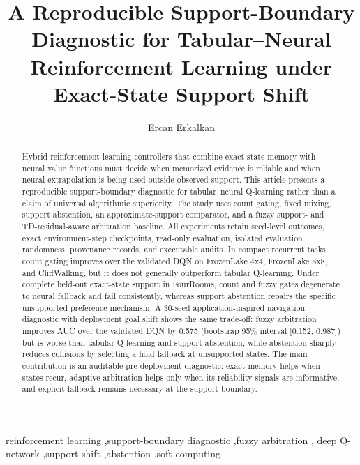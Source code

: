 \documentclass[preprint,12pt]{elsarticle}
\begin{document}
\begin{frontmatter}

\title{A Reproducible Support-Boundary Diagnostic for Tabular--Neural
Reinforcement Learning under Exact-State Support Shift}

\author[inst1]{Ercan Erkalkan}
\address[inst1]{Vocational School of Technical Sciences, Department of
Electronics and Automation, Artificial Intelligence Operator Program,
Marmara University, Mehmet Gen\c{c} Campus, 34865 Kartal, Istanbul, Turkey}

\begin{abstract}
Hybrid reinforcement-learning controllers that combine exact-state memory with
neural value functions must decide when memorized evidence is reliable and when
neural extrapolation is being used outside observed support. This article
presents a reproducible support-boundary diagnostic for tabular--neural
Q-learning rather than a claim of universal algorithmic superiority. The study
uses count gating, fixed mixing, support abstention, an approximate-support
comparator, and a fuzzy support- and TD-residual-aware arbitration baseline. All
experiments retain seed-level outcomes, exact environment-step checkpoints,
read-only evaluation, isolated evaluation randomness, provenance records, and
executable audits. In compact recurrent tasks, count gating improves over the
validated DQN on FrozenLake 4x4, FrozenLake 8x8, and CliffWalking, but it does
not generally outperform tabular Q-learning. Under complete held-out exact-state
support in FourRooms, count and fuzzy gates degenerate to neural fallback and
fail consistently, whereas support abstention repairs the specific unsupported
preference mechanism. A 30-seed application-inspired navigation diagnostic with
deployment goal shift shows the same trade-off: fuzzy arbitration improves AUC
over the validated DQN by 0.575 (bootstrap 95\% interval [0.152, 0.987]) but is
worse than tabular Q-learning and support abstention, while abstention sharply
reduces collisions by selecting a hold fallback at unsupported states. The main
contribution is an auditable pre-deployment diagnostic: exact memory helps when
states recur, adaptive arbitration helps only when its reliability signals are
informative, and explicit fallback remains necessary at the support boundary.
\end{abstract}

\begin{keyword}
reinforcement learning \sep support-boundary diagnostic \sep fuzzy arbitration \sep
deep Q-network \sep support shift \sep abstention \sep soft computing
\end{keyword}

\end{frontmatter}
\end{document}
